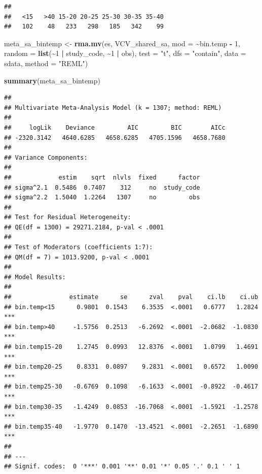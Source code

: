 \documentclass[
]{article}
\newenvironment{Shaded}{\begin{snugshade}}{\end{snugshade}}
\newcommand{\AttributeTok}[1]{\textcolor[rgb]{0.13,0.29,0.53}{#1}}
\newcommand{\DecValTok}[1]{\textcolor[rgb]{0.00,0.00,0.81}{#1}}
\newcommand{\FunctionTok}[1]{\textcolor[rgb]{0.13,0.29,0.53}{\textbf{#1}}}
\newcommand{\NormalTok}[1]{#1}
\newcommand{\OtherTok}[1]{\textcolor[rgb]{0.56,0.35,0.01}{#1}}
\newcommand{\SpecialCharTok}[1]{\textcolor[rgb]{0.81,0.36,0.00}{\textbf{#1}}}
\newcommand{\StringTok}[1]{\textcolor[rgb]{0.31,0.60,0.02}{#1}}
\begin{document}
\begin{verbatim}
## 
##   <15   >40 15-20 20-25 25-30 30-35 35-40 
##   102    48   233   298   185   342    99
\end{verbatim}

\begin{Shaded}
\begin{Highlighting}[]
\NormalTok{meta\_sa\_bintemp }\OtherTok{\textless{}{-}} \FunctionTok{rma.mv}\NormalTok{(es, VCV\_shared\_sa, }\AttributeTok{mod =} \SpecialCharTok{\textasciitilde{}}\NormalTok{bin.temp }\SpecialCharTok{{-}}
    \DecValTok{1}\NormalTok{, }\AttributeTok{random =} \FunctionTok{list}\NormalTok{(}\SpecialCharTok{\textasciitilde{}}\DecValTok{1} \SpecialCharTok{|}\NormalTok{ study\_code, }\SpecialCharTok{\textasciitilde{}}\DecValTok{1} \SpecialCharTok{|}\NormalTok{ obs), }\AttributeTok{test =} \StringTok{"t"}\NormalTok{,}
    \AttributeTok{dfs =} \StringTok{"contain"}\NormalTok{, }\AttributeTok{data =}\NormalTok{ sdata, }\AttributeTok{method =} \StringTok{"REML"}\NormalTok{)}
\end{Highlighting}
\end{Shaded}

\begin{Shaded}
\begin{Highlighting}[]
\FunctionTok{summary}\NormalTok{(meta\_sa\_bintemp)}
\end{Highlighting}
\end{Shaded}

\begin{verbatim}
## 
## Multivariate Meta-Analysis Model (k = 1307; method: REML)
## 
##     logLik    Deviance         AIC         BIC        AICc   
## -2320.3142   4640.6285   4658.6285   4705.1596   4658.7680   
## 
## Variance Components:
## 
##             estim    sqrt  nlvls  fixed      factor 
## sigma^2.1  0.5486  0.7407    312     no  study_code 
## sigma^2.2  1.5040  1.2264   1307     no         obs 
## 
## Test for Residual Heterogeneity:
## QE(df = 1300) = 29271.2184, p-val < .0001
## 
## Test of Moderators (coefficients 1:7):
## QM(df = 7) = 1013.9200, p-val < .0001
## 
## Model Results:
## 
##                estimate      se      zval    pval    ci.lb    ci.ub      
## bin.temp<15      0.9801  0.1543    6.3535  <.0001   0.6777   1.2824  *** 
## bin.temp>40     -1.5756  0.2513   -6.2692  <.0001  -2.0682  -1.0830  *** 
## bin.temp15-20    1.2745  0.0993   12.8376  <.0001   1.0799   1.4691  *** 
## bin.temp20-25    0.8331  0.0897    9.2831  <.0001   0.6572   1.0090  *** 
## bin.temp25-30   -0.6769  0.1098   -6.1633  <.0001  -0.8922  -0.4617  *** 
## bin.temp30-35   -1.4249  0.0853  -16.7068  <.0001  -1.5921  -1.2578  *** 
## bin.temp35-40   -1.9770  0.1470  -13.4521  <.0001  -2.2651  -1.6890  *** 
## 
## ---
## Signif. codes:  0 '***' 0.001 '**' 0.01 '*' 0.05 '.' 0.1 ' ' 1
\end{verbatim}
\end{document}

